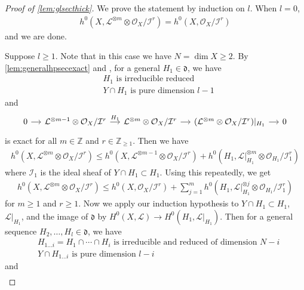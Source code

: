 \documentclass[12pt]{amsart}
\theoremstyle{plain}
\theoremstyle{definition}
\numberwithin{equation}{section}
\def\Z{{\mathbb Z}}
\def\dd{{ \mathfrak{d}}}
\def\O{{ \mathcal{O}}}
\def\I{{ \mathcal{I}}}
\def\L{{ \mathcal{L}}}
\begin{document}
\begin{proof}[Proof of \cref{lem:glsecthick}]
We prove the statement by induction on $l$.
When $l=0$, 
\begin{align}
h^{0}(X, \L^{\otimes m} \otimes \O_{X}/\I^{r}) = h^{0}(X, \O_{X}/\I^{r}) 
\end{align}
and we are done.

Suppose $l \geq 1$.
Note that in this case we have $N = \dim X \geq 2$.
By \cref{lem:generalhpsecexact} and \cite[(3.4.10), Corollary 3.4.14]{joinintersec},
for a general $H_{1} \in \dd$, we have
\begin{align}
&\text{$H_{1}$ is irreducible reduced}\\
&\text{$Y \cap H_{1}$ is pure dimension $l-1$}
\end{align}
and
\begin{equation}
\begin{tikzcd}[column sep=small] 
0 \arrow[r] & \mathcal{L}^{\otimes m-1} \otimes \O_{X}/\I^{r} \arrow[r,"H_{1}"] &  \mathcal{L}^{\otimes m} \otimes \O_{X}/\I^{r}  \arrow[r] &
(\mathcal{L}^{\otimes m} \otimes \O_{X}/\I^{r} )|_{H_{1}} \arrow[r]& 0
\end{tikzcd}
\end{equation}
is exact for all $m \in \Z$ and $r \in \Z_{\geq 1}$.
Then we have
\begin{align}
h^{0}(X, \L^{ \otimes m}  \otimes \O_{X}/\I^{r}) \leq
h^{0}(X, \L^{ \otimes m-1}  \otimes \O_{X}/\I^{r}) + h^{0}(H_{1}, \L|_{H_{1}}^{ \otimes m} \otimes \O_{H_{1}} / \I_{1}^{r})
\end{align}
where $\I_{1}$ is the ideal sheaf of $Y \cap H_{1} \subset H_{1}$.
Using this repeatedly, we get
\begin{align}
h^{0}(X, \L^{ \otimes m}  \otimes \O_{X}/\I^{r}) \leq
h^{0}(X, \O_{X}/\I^{r}) + \sum_{j=1}^{m} h^{0}(H_{1}, \L|_{H_{1}}^{ \otimes j} \otimes \O_{H_{1}}/\I_{1}^{r})
\label{eq:h0Lmboundinduction}
\end{align}
for $m \geq 1$ and $r \geq 1$.
Now we apply our induction hypothesis to
$Y \cap H_{1} \subset H_{1}$, $\L|_{H_{1}}$, and the image of $\dd$ by
$H^{0}(X, \L) \longrightarrow H^{0}(H_{1}, \L|_{H_{1}})$.
Then for a general sequence $H_{2}, \dots , H_{l} \in \dd$,
we have
\begin{align}
&\text{$H_{1\dots i}=H_{1}\cap \cdots \cap H_{i}$ is irreducible and reduced of dimension $N-i$}\\
&\text{$Y \cap H_{1\dots i}$ is pure dimension $l-i$}
\end{align}
and
\begin{align}

\end{align}
\end{proof}
\end{document}
